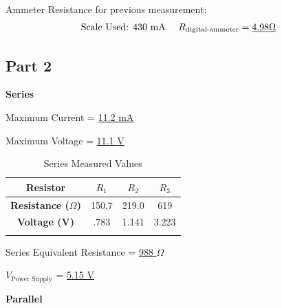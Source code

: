 \documentclass[twocolumn,english]{IEEEtran}
\theoremstyle{plain}
\theoremstyle{plain}
\begin{document}
  Ammeter Resistance for previous measurement:
  \begin{align*}
   &\text{Scale Used: $430$ mA } &R_\text{digital-ammeter} = \text{\underline{$4.98 \Omega$}} \\
  \end{align*}

  \hrulefill

  \subsection*{\textbf{Part 2}}
  \textbf{Series}

  \begin{centering}
  Maximum Current = \underline{11.2 mA}

  Maximum Voltage = \underline{11.1 V}

  \begin{table}[H]
  \centering{}
  \caption{Series Measured Values}
  \label{tb:part1_series}
  \begin{tabular}{cccc}
  \hline
  \multicolumn{1}{|c}{\textbf{Resistor}}    & \multicolumn{1}{|c}{$R_1$}    & \multicolumn{1}{|c}{$R_2$}    & \multicolumn{1}{|c|}{$R_3$}    \\ \hline
  \multicolumn{1}{|c}{\textbf{Resistance ($\Omega$)}}  & \multicolumn{1}{|c}{150.7} & \multicolumn{1}{|c}{219.0} & \multicolumn{1}{|c|}{619}   \\ \hline
  \multicolumn{1}{|c}{\textbf{Voltage (V)}} & \multicolumn{1}{|c}{.783}  & \multicolumn{1}{|c}{1.141} & \multicolumn{1}{|c|}{3.223} \\ \hline
  \multicolumn{1}{l}{}                      & \multicolumn{1}{l}{}       & \multicolumn{1}{l}{}       & \multicolumn{1}{l}{}
  \end{tabular}
  \end{table}

  Series Equivalent Resistance = \underline{988 $\Omega$}

  $V_{\text{Power Supply}}$ = \underline{5.15 V}

  \end{centering}

  \textbf{Parallel}
\end{document}
